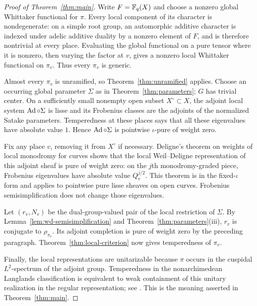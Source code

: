 \begin{proof}[Proof of Theorem~\ref{thm:main}]
Write $F=\mathbb F_q(X)$ and choose a nonzero global Whittaker functional
for $\pi$. Every local component of its character is nondegenerate:
on a simple root group, an automorphic additive character is indexed
under adelic additive duality by a nonzero element of $F$, and is
therefore nontrivial at every place. Evaluating the global functional
on a pure tensor where it is nonzero, then varying the factor at $v$,
gives a nonzero local Whittaker functional on $\pi_v$. Thus every
$\pi_v$ is generic.

Almost every $\pi_v$ is unramified, so Theorem~\ref{thm:unramified}
applies. Choose an occurring global parameter $\Sigma$ as in
Theorem~\ref{thm:parameters}; $G$ has trivial center. On a sufficiently
small nonempty open subset $X^\circ\subset X$, the adjoint local
system $\operatorname{Ad}\circ\Sigma$ is lisse and its Frobenius classes are the
adjoints of the normalized Satake parameters. Temperedness at these
places says that all these eigenvalues have absolute value $1$.
Hence $\operatorname{Ad}\circ\Sigma$ is pointwise $\iota$-pure of weight zero.

Fix any place $v$, removing it from $X^\circ$ if necessary. Deligne's
theorem on weights of local monodromy for curves
\cite[Th\'eor\`eme~1.8.4]{DeligneWeilII} shows that the local
Weil--Deligne representation of this adjoint sheaf is pure of weight
zero: on the $j$th monodromy-graded piece, Frobenius eigenvalues have
absolute value $Q_v^{j/2}$. This theorem is in the fixed-$\iota$
form and applies to pointwise pure lisse sheaves on open curves.
Frobenius semisimplification does not change those eigenvalues.

Let $(r_v,N_v)$ be the dual-group-valued pair of the local restriction
of $\Sigma$. By Lemma~\ref{lem:wd-semisimplification} and
Theorem~\ref{thm:parameters}(iii), $r_v$ is conjugate to
$\rho_{\pi_v}$. Its adjoint completion is pure of weight zero by
the preceding paragraph. Theorem~\ref{thm:local-criterion} now gives
temperedness of $\pi_v$.

Finally, the local representations are unitarizable because $\pi$
occurs in the cuspidal $L^2$-spectrum of the adjoint group.
Temperedness in the nonarchimedean Langlands classification is
equivalent to weak containment of this unitary realization in the
regular representation; see \cite{Waldspurger}. This is the meaning asserted in
Theorem~\ref{thm:main}.
\end{proof}
